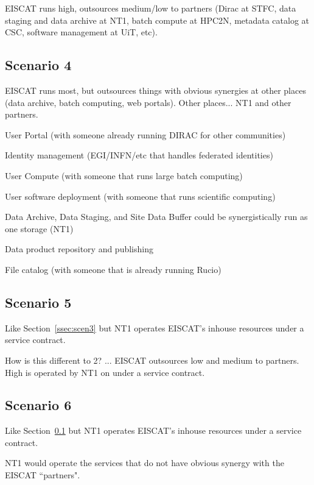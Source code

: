 \documentclass[12pt,a4paper]{article}
\begin{document}
EISCAT runs high, outsources medium/low to partners (Dirac at STFC, data staging and data archive at NT1, batch compute at HPC2N, metadata catalog at CSC, software management at UiT, etc).


\subsection{Scenario 4}
\label{ssec:scen4}

EISCAT runs most, but outsources things with obvious synergies at other places (data archive, batch computing, web portals).
Other places... NT1 and other partners.

User Portal (with someone already running DIRAC for other communities)

Identity management (EGI/INFN/etc that handles federated identities)

User Compute (with someone that runs large batch computing)

User software deployment (with someone that runs scientific computing)

Data Archive, Data Staging, and Site Data Buffer could be synergistically run as one storage (NT1)

Data product repository and publishing

File catalog (with someone that is already running Rucio)

\subsection{Scenario 5}
\label{ssec:scen5}

Like Section~\ref{ssec:scen3} but NT1 operates EISCAT's inhouse resources under a service contract.

How is this different to 2? ... EISCAT outsources low and medium to partners. High is operated by NT1 on under a service contract.

\subsection{Scenario 6}
\label{ssec:scen6}

Like Section~\ref{ssec:scen4} but NT1 operates EISCAT's inhouse resources under a service contract.

NT1 would operate the services that do not have obvious synergy with the EISCAT ``partners".


\newpage
{}

\end{document}
